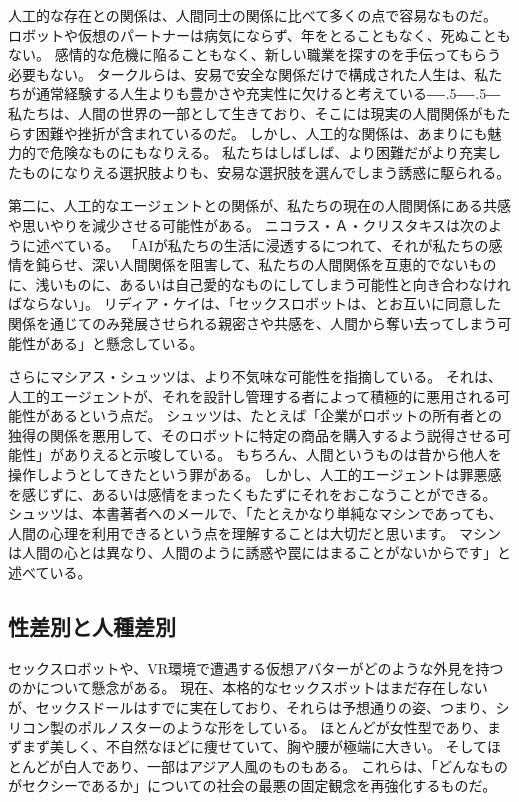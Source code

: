 \documentclass[paper=a4,book,openany]{jlreq}
\def\DDASH{―\kern-.5\zw―\kern-.5\zw―}
\begin{document}
人工的な存在との関係は、人間同士の関係に比べて多くの点で容易なものだ。
ロボットや仮想のパートナーは病気にならず、年をとることもなく、死ぬこともない。
感情的な危機に陥ることもなく、新しい職業を探すのを手伝ってもらう必要もない。
タークルらは、安易で安全な関係だけで構成された人生は、私たちが通常経験する人生よりも豊かさや充実性に欠けると考えている{\DDASH}
私たちは、人間の世界の一部として生きており、そこには現実の人間関係がもたらす困難や挫折が含まれているのだ。
しかし、人工的な関係は、あまりにも魅力的で危険なものにもなりえる。
私たちはしばしば、より困難だがより充実したものになりえる選択肢よりも、安易な選択肢を選んでしまう誘惑に駆られる。

第二に、人工的なエージェントとの関係が、私たちの現在の人間関係にある共感や思いやりを減少させる可能性がある。
ニコラス・Ａ・クリスタキスは次のように述べている。
「AIが私たちの生活に浸透するにつれて、それが私たちの感情を鈍らせ、深い人間関係を阻害して、私たちの人間関係を互恵的でないものに、浅いものに、あるいは自己愛的なものにしてしまう可能性と向き合わなければならない」\citep{christakis19:_how_ai_will_rewir_us}。
リディア・ケイは、「セックスロボットは、とお互いに同意した関係を通じてのみ発展させられる親密さや共感を、人間から奪い去ってしまう可能性がある」と懸念している\citep{responsible17:_our_sexual_futur_robot}。

さらにマシアス・シュッツは、より不気味な可能性を指摘している。
それは、人工的エージェントが、それを設計し管理する者によって積極的に悪用される可能性があるという点だ。
シュッツは、たとえば「企業がロボットの所有者との独得の関係を悪用して、そのロボットに特定の商品を購入するよう説得させる可能性」がありえると示唆している。
もちろん、人間というものは昔から他人を操作しようとしてきたという罪がある。
しかし、人工的エージェントは罪悪感を感じずに、あるいは感情をまったくもたずにそれをおこなうことができる。
シュッツは、本書著者へのメールで、「たとえかなり単純なマシンであっても、人間の心理を利用できるという点を理解することは大切だと思います。
マシンは人間の心とは異なり、人間のように誘惑や罠にはまることがないからです」と述べている。

\subsection{性差別と人種差別}

セックスロボットや、VR環境で遭遇する仮想アバターがどのような外見を持つのかについて懸念がある。
現在、本格的なセックスボットはまだ存在しないが、セックスドールはすでに実在しており、それらは予想通りの姿、つまり、シリコン製のポルノスターのような形をしている。
ほとんどが女性型であり、まずまず美しく、不自然なほどに痩せていて、胸や腰が極端に大きい。
そしてほとんどが白人であり、一部はアジア人風のものもある。
これらは、「どんなものがセクシーであるか」についての社会の最悪の固定観念を再強化するものだ。
\end{document}

